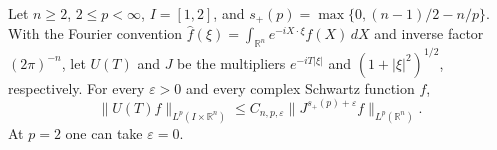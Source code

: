Let \(n\ge2\), \(2\le p<\infty\), \(I=[1,2]\), and
\(s_+(p)=\max\{0,(n-1)/2-n/p\}\). With the Fourier convention
\(\widehat f(\xi)=\int_{\mathbb R^n}e^{-iX\cdot\xi}f(X)\,dX\) and
inverse factor \((2\pi)^{-n}\), let \(U(T)\) and \(J\) be the
multipliers \(e^{-iT|\xi|}\) and \((1+|\xi|^2)^{1/2}\), respectively.
For every \(\varepsilon>0\) and every complex Schwartz function \(f\),
\[
 \|U(T)f\|_{L^p(I\times\mathbb R^n)}
 \le C_{n,p,\varepsilon}\|J^{s_+(p)+\varepsilon}f\|_{L^p(\mathbb R^n)}.
\]
At \(p=2\) one can take \(\varepsilon=0\).
